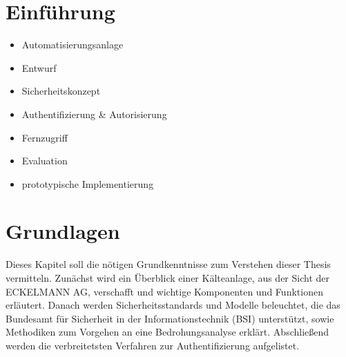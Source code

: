 \documentclass[11pt,a4paper]{report}
\begin{document}

\tableofcontents
\clearpage 


\chapter{Einführung} \label{chap:intro}

\begin{itemize}
\item Automatisierungsanlage
\item Entwurf 
\item Sicherheitskonzept
\item Authentifizierung \& Autorisierung
\item Fernzugriff
\item Evaluation
\item prototypische Implementierung
\end{itemize}

\chapter{Grundlagen} \label{chap:basics}

Dieses Kapitel soll die nötigen Grundkenntnisse zum Verstehen dieser Thesis vermitteln. Zunächst wird ein Überblick einer Kälteanlage, aus der Sicht der ECKELMANN AG, verschafft und wichtige Komponenten und Funktionen erläutert. Danach werden Sicherheitsstandards und Modelle beleuchtet, die das Bundesamt für Sicherheit in der Informationstechnik (BSI) unterstützt, sowie Methodiken zum Vorgehen an eine Bedrohungsanalyse erklärt. Abschließend werden die verbreitetsten Verfahren zur Authentifizierung aufgelistet.
\end{document}
